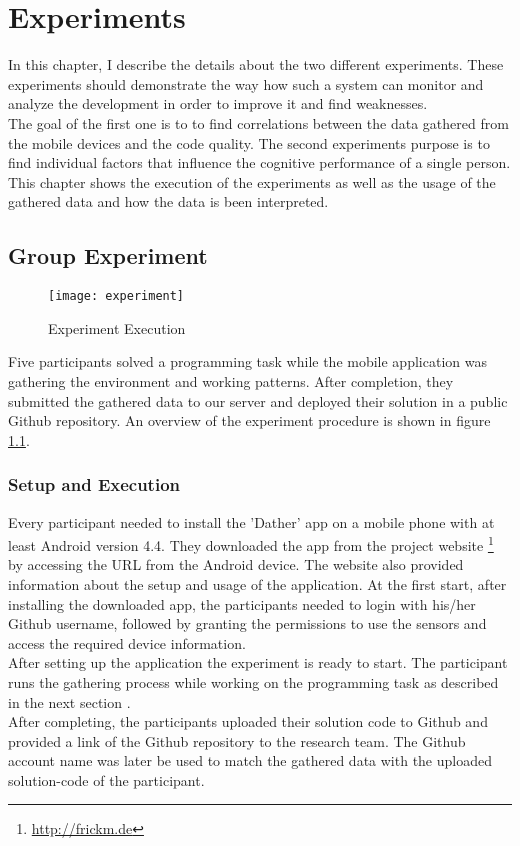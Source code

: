 \chapter{Experiments}
In this chapter, I describe the details about the two different experiments.
These experiments should demonstrate the way how such a system can monitor and analyze the development in order to improve it and find weaknesses.\\
The goal of the first one is to to find correlations between the data gathered from the mobile devices and the code quality. The second experiments purpose is to find individual factors that influence the cognitive performance of a single person. \\
This chapter shows the execution of the experiments as well as the usage of the gathered data and how the data is been interpreted. 

\section{Group Experiment}

\begin{figure}
\texttt{[image: experiment]}
\caption{Experiment Execution}\label{experiment}
\vspace{10 mm}
\end{figure}

Five participants solved a programming task while the mobile application was gathering the environment and working patterns. 
After completion, they submitted the gathered data to our server and deployed their solution in a public Github repository. 
An overview of the experiment procedure is shown in figure \ref{experiment}.
 
\subsection{Setup and Execution}
Every participant needed to install the 'Dather' app on a mobile phone with at least Android version 4.4.  
They downloaded the app from the project website \footnote{\url{http://frickm.de}} by accessing the URL from the Android device. The website also provided information about the setup and usage of the application. 
\bigbreak
At the first start, after installing the downloaded app, the participants needed to login with his/her Github username, followed by granting the permissions to use the sensors and access the required device information.\\
After setting up the application the experiment is ready to start. 
The participant runs the gathering process while working on the programming task as described in the next section .\\
After completing, the participants uploaded their solution code to Github and provided a link of the Github repository to the research team. The Github account name was later be used to match the gathered data with the uploaded solution-code of the participant. 

